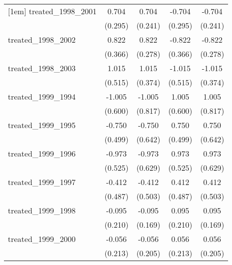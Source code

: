 {\begin{tabular}{l*{4}{c}}
[1em]
treated\_1998\_2001&       0.704\sym{*}  &       0.704\sym{**} &      -0.704\sym{*}  &      -0.704\sym{**} \\
            &     (0.295)         &     (0.241)         &     (0.295)         &     (0.241)         \\
[1em]
treated\_1998\_2002&       0.822\sym{*}  &       0.822\sym{**} &      -0.822\sym{*}  &      -0.822\sym{**} \\
            &     (0.366)         &     (0.278)         &     (0.366)         &     (0.278)         \\
[1em]
treated\_1998\_2003&       1.015\sym{*}  &       1.015\sym{**} &      -1.015\sym{*}  &      -1.015\sym{**} \\
            &     (0.515)         &     (0.374)         &     (0.515)         &     (0.374)         \\
[1em]
treated\_1999\_1994&      -1.005         &      -1.005         &       1.005         &       1.005         \\
            &     (0.600)         &     (0.817)         &     (0.600)         &     (0.817)         \\
[1em]
treated\_1999\_1995&      -0.750         &      -0.750         &       0.750         &       0.750         \\
            &     (0.499)         &     (0.642)         &     (0.499)         &     (0.642)         \\
[1em]
treated\_1999\_1996&      -0.973         &      -0.973         &       0.973         &       0.973         \\
            &     (0.525)         &     (0.629)         &     (0.525)         &     (0.629)         \\
[1em]
treated\_1999\_1997&      -0.412         &      -0.412         &       0.412         &       0.412         \\
            &     (0.487)         &     (0.503)         &     (0.487)         &     (0.503)         \\
[1em]
treated\_1999\_1998&      -0.095         &      -0.095         &       0.095         &       0.095         \\
            &     (0.210)         &     (0.169)         &     (0.210)         &     (0.169)         \\
[1em]
treated\_1999\_2000&      -0.056         &      -0.056         &       0.056         &       0.056         \\
            &     (0.213)         &     (0.205)         &     (0.213)         &     (0.205)         \\

\end{tabular}}

